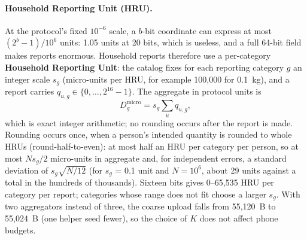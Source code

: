 \documentclass[10pt,twoside,openany]{book}
\theoremstyle{dpepstyle}
\begin{document}
\paragraph{Household Reporting Unit (HRU).}
At the protocol's fixed $10^{-6}$ scale, a $b$-bit coordinate can express at most $(2^b-1)/10^6$ units: 1.05 units at 20 bits, which is useless, and a full 64-bit field makes reports enormous. Household reports therefore use a per-category \textbf{Household Reporting Unit}: the catalog fixes for each reporting category $g$ an integer scale $s_g$ (micro-units per HRU, for example 100{,}000 for 0.1~kg), and a report carries $q_{u,g} \in \{0,\dots,2^{16}-1\}$. The aggregate in protocol units is
\[
  D_g^{\text{micro}} = s_g \sum_u q_{u,g},
\]
which is exact integer arithmetic; no rounding occurs after the report is made. Rounding occurs once, when a person's intended quantity is rounded to whole HRUs (round-half-to-even): at most half an HRU per category per person, so at most $N s_g/2$ micro-units in aggregate and, for independent errors, a standard deviation of $s_g\sqrt{N/12}$ (for $s_g$ = 0.1 unit and $N=10^6$, about 29 units against a total in the hundreds of thousands). Sixteen bits gives 0--65,535 HRU per category per report; categories whose range does not fit choose a larger $s_g$. With two aggregators instead of three, the coarse upload falls from 55,120~B to 55,024~B (one helper seed fewer), so the choice of $K$ does not affect phone budgets.
\end{document}
